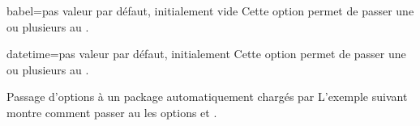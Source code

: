 \begin{docKey}{babel}{=}{pas valeur par défaut,
    initialement vide}
  Cette option permet de passer une ou plusieurs  au
  .
\end{docKey}
\begin{docKey}{datetime}{=}{pas valeur par défaut,
    initialement }
  Cette option permet de passer une ou plusieurs  au
  .
\end{docKey}
%
%

\begin{dbexample}{Passage d'options à un package  automatiquement chargés par \yat}{}
  L'exemple suivant montre comment passer au  les options
   et .
\end{dbexample}

